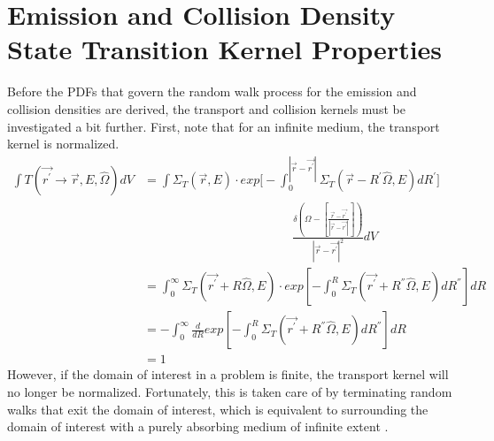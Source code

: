 \section{Emission and Collision Density State Transition Kernel Properties}
Before the PDFs that govern the random walk process for the emission and
collision densities are derived, the transport and collision kernels must be 
investigated a bit further. First, note that for an infinite medium, the 
transport kernel is normalized. 
\begin{align}
  \int T(\vec{r^{'}} \to \vec{r},E,\hat{\Omega})dV & =
    \int \Sigma_T(\vec{r},E)
    \cdot exp\Big[-\int_0^{|\vec{r} - \vec{r^{'}}|} 
      \Sigma_T(\vec{r}-R^{'}\hat{\Omega},E)dR^{'} \Big] \nonumber \\
    & \qquad \qquad \qquad \qquad \qquad \qquad
    \frac{\delta \left(\Omega - \left[\frac{\vec{r} - \vec{r^{'}}}
        {|\vec{r} - \vec{r^{'}}|}\right]\right)}
    {|\vec{r} - \vec{r^{'}}|^2} dV \nonumber \\
  & = \int_0^{\infty} \Sigma_T(\vec{r^{'}}+R\hat{\Omega},E)
  \cdot exp\left[-\int_0^R \Sigma_T(\vec{r^{'}}+R^{''}\hat{\Omega},E)
    dR^{''} \right] dR \nonumber \\
  & = -\int_0^{\infty} \frac{d}{dR} exp\left[-\int_0^R 
    \Sigma_T(\vec{r^{'}}+R^{''}\hat{\Omega},E) dR^{''} \right] dR 
  \nonumber \\
  & = 1 \nonumber
\end{align}
However, if the domain of interest in a problem is finite, the transport kernel 
will no longer be normalized. Fortunately, this is taken care of by terminating 
random walks that exit the domain of interest, which is equivalent to 
surrounding the domain of interest with a purely absorbing medium of infinite 
extent \citep{irving_adjoint_1971}.

